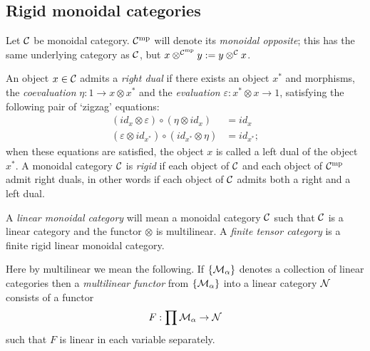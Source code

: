 \documentclass{amsart}
\begin{document}
\subsection{Rigid monoidal categories}


Let $\mathcal C$ be monoidal category. $\mathcal C^{\mathrm{mp}}$ will denote its {\em monoidal opposite}; this has the same underlying category as $\mathcal C$, but $x \otimes^{\mathcal C^{\mathrm{mp}}} y : = y \otimes^{\mathcal C} x$. 

\begin{definition} \label{def:rigid}
	An object $x \in \mathcal C$ admits a {\em right dual} if there exists an object $x^*$ and morphisms, the {\em coevaluation} $\eta: 1 \to x \otimes x^*$ and the {\em evaluation} $\varepsilon: x^* \otimes x \to 1$, satisfying the following pair of `zigzag' equations:
	\begin{align*}
		(id_{x} \otimes \varepsilon  ) \circ (  \eta \otimes id_{x}) &= id_{x} \\
		(\varepsilon \otimes id_{x^*}) \circ (id_{x^*} \otimes \eta) &= id_{x^*};
	\end{align*}
	when these equations are satisfied, the object $x$ is called a left dual of the object $x^*$.  A monoidal category $\mathcal C$ is {\em rigid} if each object of $\mathcal C$ and each object of $\mathcal C^{\mathrm{mp}}$ admit right duals, in other words if each object of $\mathcal C$ admits both a right and a left dual. 
\end{definition}



\begin{definition}
	A {\em linear monoidal category} will mean a monoidal category $\mathcal C$ such that $\mathcal C$ is a linear category and the functor $\otimes$ is multilinear. A {\em finite tensor category} is a finite rigid linear monoidal category.   
\end{definition}

	Here by multilinear we mean the following.  If $\{\mathcal M_\alpha\}$ denotes a collection of linear categories then a {\em multilinear functor} from $\{\mathcal M_\alpha\}$ into a linear category $\mathcal N$ consists of a functor
\begin{equation*}
	F: \prod \mathcal M_\alpha \to \mathcal N
\end{equation*}
such that $F$ is linear in each variable separately. 
\end{document}

